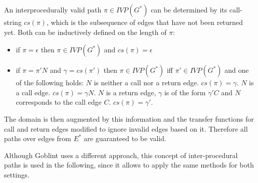 An interprocedurally valid path $\pi \in \mathit{IVP}(G^*)$ can be determined by its call-string $cs(\pi)$, which is the subsequence of edges that have not been returned yet. Both can be inductively defined on the length of $\pi$:
\begin{itemize}
\item if $\pi = \epsilon$ then $\pi \in \mathit{IVP}(G^*)$ and $cs(\pi) = \epsilon$
\item if $\pi = \pi' N$ and $\gamma = cs(\pi')$ then $\pi \in \mathit{IVP}(G^*)$ iff $\pi' \in \mathit{IVP}(G^*)$ and one of the following holds:
\subitem $N$ is neither a call nor a return edge. $cs(\pi) = \gamma$.
\subitem $N$ is a call edge. $cs(\pi) = \gamma N$.
\subitem $N$ is a return edge, $\gamma$ is of the form $\gamma' C$ and $N$ corresponds to the call edge $C$. $cs(\pi) = \gamma'$.
\end{itemize}

The domain is then augmented by this information and the transfer functions for call and return edges modified to ignore invalid edges based on it. Therefore all paths over edges from $E^*$ are guaranteed to be valid.

Although Goblint uses a different approach, this concept of inter-procedural paths is used in the following, since it allows to apply the same methods for both settings.





